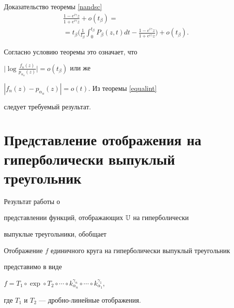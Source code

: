 \begin{pf*}{Доказательство теоремы \ref{nandsc}}
\begin{multline*}
\frac{1-e^{i\gamma}z}{1+e^{i\gamma}z}+o(t_\beta)=\\


%


=t_\beta\bigg(\frac1{t_\beta}\int_0^{t_\beta}P_\beta(z,t)dt-


\frac{1-e^{i\gamma}z}{1+e^{i\gamma}z}\bigg)+o(t_\beta).


\end{multline*}


Согласно условию теоремы это означает, что


$\big|\log\frac{f_n(z)}{p_{\alpha_n}(z)}\big|=o(t_\beta)$ или же


$|f_n(z)-p_{\alpha_n}(z)|=o(t)$. Из теоремы \ref{equalint}


следует требуемый результат.


\end{pf*}








\section{Представление отображения на гиперболически выпуклый треугольник}





Результат работы \cite{PR} о


представлении функций, отображающих $\Bbb U$ на гиперболически


выпуклые треугольники, обобщает





\begin{thm}\label{giper} 


Отображение $f$ единичного круга на гиперболически выпуклый треугольник


представимо в виде


$f=T_1\circ \exp\circ T_2\circ\dotsb\circ


k_{\alpha_n}^{\gamma_n}\circ\dotsb\circ k_{\alpha_1}^{\gamma_1}$,


где $T_1$ и $T_2$ --- дробно-линейные отображения.


\end{thm}





